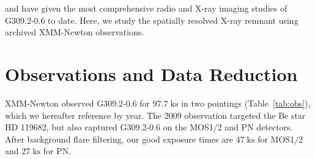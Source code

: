 \documentclass[preprint2,tighten,trackchanges]{aastex6}
\newcommand*{\mt}{\mathrm}
\newcommand*{\unit}[1]{\;\mt{#1}}  %
\begin{document}



 and  have given the most
comprehensive radio and X-ray imaging studies of G309.2-0.6 to date.
Here, we study the spatially resolved X-ray remnant using archived XMM-Newton
observations.

%
%
%
%
%
%
%


\section{Observations and Data Reduction} \label{sec:obs}

XMM-Newton observed G309.2-0.6 for $97.7 \unit{ks}$ in two pointings
(Table~\ref{tab:obs}), which we hereafter reference by year.
The 2009 observation targeted the Be star HD 119682, but also captured
G309.2-0.6 on the MOS1/2 and PN detectors.
After background flare filtering, our good exposure times are $47 \unit{ks}$
for MOS1/2 and $27 \unit{ks}$ for PN.
\end{document}
